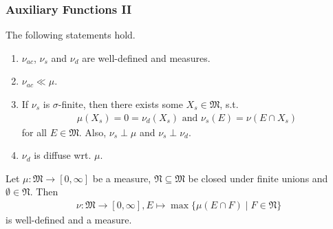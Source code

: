 \documentclass[10pt, hyperref={hidelinks}]{beamer}
\begin{document}
    \begin{frame}
        \frametitle{Auxiliary Functions II}

        \begin{lemma} \label{lem:auxiliary_functions_lemma}
            The following statements hold.
            \begin{enumerate}[label=(\roman*), wide]
                \item \label{lem:auxiliary_functions_lemma_1} \(\nu_{ac}\), \(\nu_s\) and \(\nu_d\) are well-defined and measures.
                \item \label{lem:auxiliary_functions_lemma_2} \(\nu_{ac} \ll \mu\).
                \item \label{lem:auxiliary_functions_lemma_3} If \(\nu_s\) is \(\sigma\)-finite, then there exists some \(X_s \in \mathfrak{M}\), s.t.
                \begin{align}
                    \mu(X_s) = 0 = \nu_d(X_s) \text{ and } \nu_s(E) = \nu(E \cap X_s)
                \end{align}
                for all \(E \in \mathfrak{M}\). Also, \(\nu_s \perp \mu\) and \(\nu_s \perp \nu_d\).
                \item \label{lem:auxiliary_functions_lemma_4} \(\nu_{d}\) is diffuse wrt. \(\mu\).
            \end{enumerate}
        \end{lemma}

        \pause

        \begin{lemma} \label{lem:special_measure_1}
            Let \(\mu\colon \mathfrak{M} \to [0, \infty]\) be a measure, \(\mathfrak{N} \subseteq \mathfrak{M}\) be closed under finite unions and \(\emptyset \in \mathfrak{N}\). Then
            \begin{align}
                \nu\colon \mathfrak{M} \to [0, \infty], E \mapsto \max\{\mu(E \cap F) \mid F \in \mathfrak{N}\}
            \end{align}
            is well-defined and a measure.
        \end{lemma}
    \end{frame}
\end{document}
